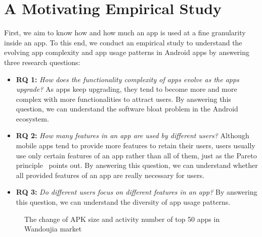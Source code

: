 \section{A Motivating Empirical Study}
\label{sec:motivation}

First, we aim to know how and how much an app is used at a fine granularity inside an app. To this end, we conduct an empirical study to understand the evolving app complexity and app usage patterns in Android apps by answering three research questions:

\begin{itemize}
	\item {\textbf{RQ 1:} \textit{How does the functionality complexity of apps evolve as the apps upgrade?} As apps keep upgrading, they tend to become more and more complex with more functionalities to attract users. By answering this question, we can understand the software bloat problem in the Android ecosystem.}
	\item {\textbf{RQ 2:} \textit{How many features in an app are used by different users?} Although mobile apps tend to provide more features to retain their users, users usually use only certain features of an app rather than all of them, just as the Pareto principle~\cite{Pareto_principle} points out. By answering this question, we can understand whether all provided features of an app are really necessary for users.}
	\item {\textbf{RQ 3:} \textit{Do different users focus on different features in an app?} By answering this question, we can understand the diversity of app usage patterns.}
\end{itemize}


\begin{figure}
   \centering
  \hspace{0in}
  \caption{The change of APK size and activity number of top 50 apps in Wandoujia market}
  \label{fig:topapp}
\end{figure}

